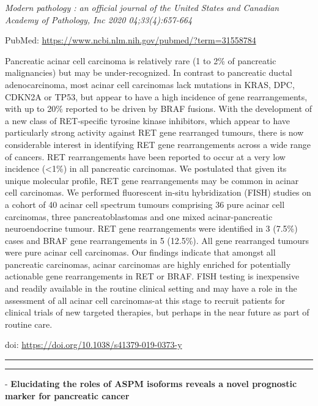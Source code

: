 \documentclass[
]{article}
\begin{document}
\emph{Modern pathology : an official journal of the United States and
Canadian Academy of Pathology, Inc 2020 04;33(4):657-664}

PubMed: \url{https://www.ncbi.nlm.nih.gov/pubmed/?term=31558784}

Pancreatic acinar cell carcinoma is relatively rare (1 to 2\% of
pancreatic malignancies) but may be under-recognized. In contrast to
pancreatic ductal adenocarcinoma, most acinar cell carcinomas lack
mutations in KRAS, DPC, CDKN2A or TP53, but appear to have a high
incidence of gene rearrangements, with up to 20\% reported to be driven
by BRAF fusions. With the development of a new class of RET-specific
tyrosine kinase inhibitors, which appear to have particularly strong
activity against RET gene rearranged tumours, there is now considerable
interest in identifying RET gene rearrangements across a wide range of
cancers. RET rearrangements have been reported to occur at a very low
incidence (\textless1\%) in all pancreatic carcinomas. We postulated
that given its unique molecular profile, RET gene rearrangements may be
common in acinar cell carcinomas. We performed fluorescent in-situ
hybridization (FISH) studies on a cohort of 40 acinar cell spectrum
tumours comprising 36 pure acinar cell carcinomas, three
pancreatoblastomas and one mixed acinar-pancreatic neuroendocrine
tumour. RET gene rearrangements were identified in 3 (7.5\%) cases and
BRAF gene rearrangements in 5 (12.5\%). All gene rearranged tumours were
pure acinar cell carcinomas. Our findings indicate that amongst all
pancreatic carcinomas, acinar carcinomas are highly enriched for
potentially actionable gene rearrangements in RET or BRAF. FISH testing
is inexpensive and readily available in the routine clinical setting and
may have a role in the assessment of all acinar cell carcinomas-at this
stage to recruit patients for clinical trials of new targeted therapies,
but perhaps in the near future as part of routine care.

doi: \url{https://doi.org/10.1038/s41379-019-0373-y}

\begin{center}\rule{0.5\linewidth}{0.5pt}\end{center}

\begin{center}\rule{0.5\linewidth}{0.5pt}\end{center}

- \textbf{Elucidating the roles of ASPM isoforms reveals a novel
prognostic marker for pancreatic cancer}
\end{document}

